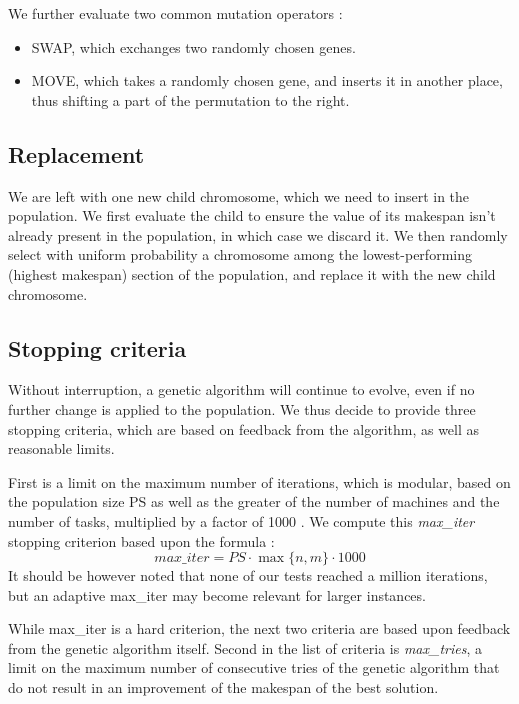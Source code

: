 \documentclass{mimosis}
\begin{document}
We further evaluate two common mutation operators :
\begin{itemize}
\item SWAP, which exchanges two randomly chosen genes.
\item MOVE, which takes a randomly chosen gene, and inserts it in another place, thus shifting a part of the permutation to the right.
\end{itemize} 

\subsection{Replacement}
We are left with one new child chromosome, which we need to insert in the population. We first evaluate the child to ensure the value of its makespan isn't already present in the population, in which case we discard it. We then randomly select with uniform probability a chromosome among the lowest-performing (highest makespan) section of the population, and replace it with the new child chromosome.

\subsection{Stopping criteria}

Without interruption, a genetic algorithm will continue to evolve, even if no further change is applied to the population. We thus decide to provide three stopping criteria, which are based on feedback from the algorithm, as well as reasonable limits.

First is a limit on the maximum number of iterations, which is modular, based on the population size PS as well as the greater of the number of machines and the number of tasks, multiplied by a factor of 1000 \citep{tellache2023genetic}. We compute this \emph{max\_iter} stopping criterion based upon the formula :
\begin{equation} \label{max_iter_equ}
max\_iter = PS \cdot \max \{n,m\} \cdot 1000
\end{equation}
It should be however noted that none of our tests reached a million iterations, but an adaptive max\_iter may become relevant for larger instances. 

While max\_iter is a hard criterion, the next two criteria are based upon feedback from the genetic algorithm itself. Second in the list of criteria is \emph{max\_tries}, a limit on the maximum number of consecutive tries of the genetic algorithm that do not result in an improvement of the makespan of the best solution. 
\end{document}
